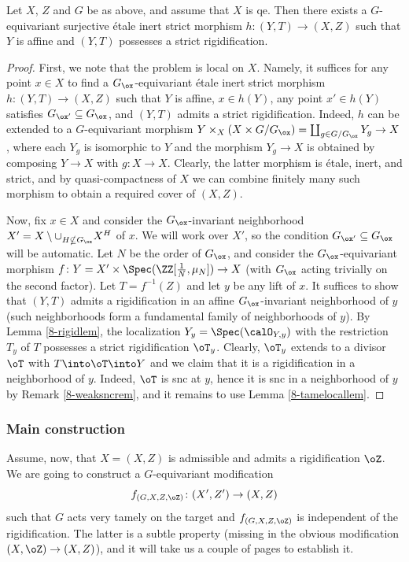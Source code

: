 \documentclass[10pt]{../fichiers-configuration-latex/smfart}
\begin{document}
\begin{lemma2}\label{8-rigidlem2} Let $X$, $Z$ and $G$ be as above,
and assume that $X$ is qe. Then there exists a $G$-equivariant
surjective \'etale inert strict morphism $h{\colon}(Y,T)\to(X,Z)$
such that $Y$ is affine and $(Y,T)$ possesses a strict
rigidification.  \end{lemma2} \begin{proof} First, we note that the
problem is local on $X$. Namely, it suffices for any point $x\in
X$ to find a $G_\ox$-equivariant \'etale inert strict morphism
$h{\colon}(Y,T)\to(X,Z)$ such that $Y$ is affine, $x\in h(Y)$, any
point $x'\in h(Y)$ satisfies $G_{\ox'}\subseteq G_\ox$, and $(Y,T)$
admits a strict rigidification. Indeed, $h$ can be extended to a
$G$-equivariant morphism $Y\times_X(X\times G/G_\ox)=\coprod_{g\in
G/G_\ox}Y_g\to X$, where each $Y_g$ is isomorphic to $Y$ and
the morphism $Y_g\to X$ is obtained by composing $Y\to X$ with
$g{\colon}X\to X$. Clearly, the latter morphism is \'etale, inert,
and strict, and by quasi-compactness of $X$ we can combine finitely
many such morphism to obtain a required cover of $(X,Z)$.

Now, fix $x\in X$ and consider the $G_\ox$-invariant neighborhood
$X'=X\setminus\cup_{H\nsubseteq G_\ox}X^H$ of $x$. We
will work over $X'$, so the condition  $G_{\ox'}\subseteq
G_{\ox}$ will be automatic. Let $N$ be the order of
$G_\ox$, and consider the $G_\ox$-equivariant morphism
$f{\colon}Y=X'\times\Spec(\ZZ[\frac{1}{N},\mu_N])\to X$ (with
$G_\ox$ acting trivially on the second factor). Let $T=f^{-1}(Z)$
and let $y$ be any lift of $x$. It suffices to show that
$(Y,T)$ admits a rigidification in an affine $G_\ox$-invariant
neighborhood of $y$ (such neighborhoods form a fundamental
family of neighborhoods of $y$). By Lemma \ref{8-rigidlem}, the
localization $Y_y=\Spec(\calO_{Y,y})$ with the restriction $T_y$
of $T$ possesses a strict rigidification $\oT_y$. Clearly, $\oT_y$
extends to a divisor $\oT$ with $T\into\oT\into Y$ and we claim
that it is a rigidification in a neighborhood of $y$. Indeed, $\oT$
is snc at $y$, hence it is snc in a neighborhood of $y$ by Remark
\ref{8-weaksncrem}, and it remains to use Lemma \ref{8-tamelocallem}.
\end{proof}

\subsubsection{Main construction}\label{8-constrsec} Assume,
now, that $X=(X,Z)$ is admissible and admits a rigidification
$\oZ$. We are going to construct a $G$-equivariant modification
$$f_{(G,X,Z,\oZ)}{\colon}(X',Z')\to(X,Z)$$ such that $G$ acts very
tamely on the target and $f_{(G,X,Z,\oZ)}$ is independent of the
rigidification. The latter is a subtle property (missing in the
obvious modification $(X,\oZ)\to(X,Z)$), and it will take us a
couple of pages to establish it.
\end{document}
